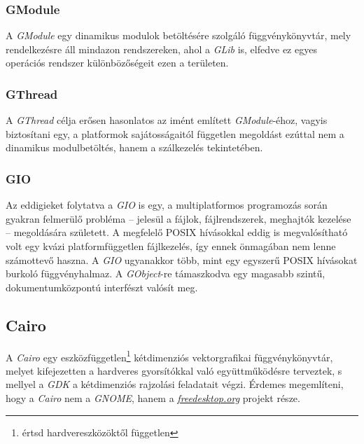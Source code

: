 \subsubsection{GModule}

A \textit{GModule} egy dinamikus modulok betöltésére szolgáló függvénykönyvtár, mely rendelkezésre áll mindazon rendszereken, ahol a \textit{GLib} is, elfedve ez egyes operációs rendszer különbözőségeit ezen a területen.

\subsubsection{GThread}

A \textit{GThread} célja erősen hasonlatos az imént említett \textit{GModule}-éhoz, vagyis biztosítani egy, a platformok sajátosságaitól független megoldást ezúttal nem a dinamikus modulbetöltés, hanem a szálkezelés tekintetében.

\subsubsection{GIO}

Az eddigieket folytatva a \textit{GIO} is egy, a multiplatformos programozás során gyakran felmerülő probléma -- jelesül a fájlok, fájlrendszerek, meghajtók kezelése -- megoldására született. A megfelelő POSIX hívásokkal eddig is megvalósítható volt egy kvázi platformfüggetlen fájlkezelés, így ennek önmagában nem lenne számottevő haszna. A \textit{GIO} ugyanakkor több, mint egy egyszerű POSIX hívásokat burkoló függvényhalmaz. A \textit{GObject}-re támaszkodva egy magasabb szintű, dokumentumközpontú interfészt valósít meg.

\subsection{Cairo}

A \textit{Cairo} egy eszközfüggetlen\footnote{értsd hardvereszközöktől független} kétdimenziós vektorgrafikai függvénykönyvtár, melyet kifejezetten a hardveres gyorsítókkal való együttműködésre terveztek, s mellyel a \textit{GDK} a kétdimenziós rajzolási feladatait végzi. Érdemes megemlíteni, hogy a \textit{Cairo} nem a \textit{GNOME}, hanem a \href{http://freedesktop.org}{\textit{freedesktop.org}} projekt része.

